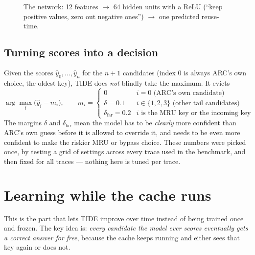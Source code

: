\documentclass[10pt,a4paper]{article}
\begin{document}
\begin{figure}[H]
\centering
{}
\caption{The network: 12 features $\to$ 64 hidden units with a ReLU (``keep positive values, zero out
negative ones'') $\to$ one predicted reuse-time.}
\end{figure}

\subsection{Turning scores into a decision}
Given the scores $\hat{y}_0,\dots,\hat{y}_n$ for the $n{+}1$ candidates (index 0 is always ARC's own
choice, the oldest key), TIDE does \emph{not} blindly take the maximum. It evicts
\[
\arg\max_i \big(\hat{y}_i - m_i\big), \qquad m_i =
\begin{cases}
0 & i = 0 \text{ (ARC's own candidate)}\\
\delta = 0.1 & i \in \{1,2,3\} \text{ (other tail candidates)}\\
\delta_{\text{far}} = 0.2 & i \text{ is the MRU key or the incoming key}
\end{cases}
\]
The margins $\delta$ and $\delta_{\text{far}}$ mean the model has to be \emph{clearly} more confident
than ARC's own guess before it is allowed to override it, and needs to be even more confident to make the
riskier MRU or bypass choice. These numbers were picked once, by testing a grid of settings across every
trace used in the benchmark, and then fixed for all traces --- nothing here is tuned per trace.

\section{Learning while the cache runs}
This is the part that lets TIDE improve over time instead of being trained once and frozen. The key idea
is: \emph{every candidate the model ever scores eventually gets a correct answer for free}, because the
cache keeps running and either sees that key again or does not.
\end{document}

